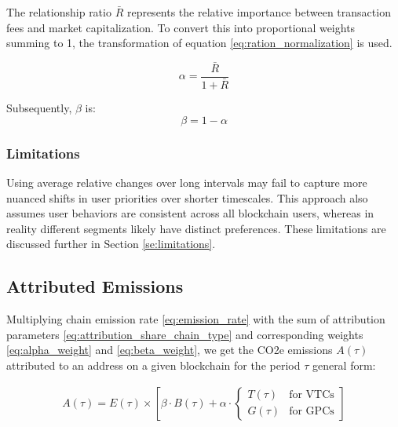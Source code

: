 \documentclass[11pt]{report}
\begin{document}
The relationship ratio $\bar{R}$ represents the relative importance between transaction fees and market capitalization. To convert this into proportional weights summing to 1, the transformation of equation \eqref{eq:ration_normalization} is used.

\begin{equation} \label{eq:alpha_weight}
    \alpha = \frac{\bar{R}}{1 + \bar{R}}
\end{equation}

Subsequently, \( \beta \) is:
\begin{equation} \label{eq:beta_weight}
    \beta = 1 - \alpha
\end{equation}


\subsubsection{Limitations}
Using average relative changes over long intervals may fail to capture more nuanced shifts in user priorities over shorter timescales. This approach also assumes user behaviors are consistent across all blockchain users, whereas in reality different segments likely have distinct preferences. These limitations are discussed further in Section \ref{se:limitations}.





\subsection{Attributed Emissions}

Multiplying chain emission rate \eqref{eq:emission_rate} with the sum of attribution parameters \eqref{eq:attribution_share_chain_type} and corresponding weights \eqref{eq:alpha_weight} and \eqref{eq:beta_weight}, we get the CO2e emissions \(A(\tau)\) attributed to an address on a given blockchain for the period $\tau$ general form:


\begin{align}
    A(\tau) = E(\tau) \times \left[\beta \cdot B(\tau) + \alpha \cdot \begin{cases}
                                                                              T(\tau) & \text{for VTCs} \\
                                                                              G(\tau) & \text{for GPCs}
                                                                          \end{cases}\right]
\end{align}
\end{document}
